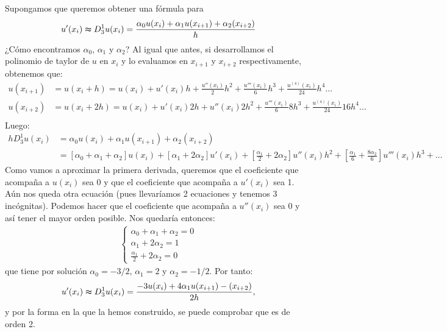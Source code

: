 \noindent Supongamos que queremos obtener una fórmula para
\begin{align*}
    u'(x_i) \thickapprox D_3^1u(x_i) = \frac{\alpha_0u(x_i) + \alpha_1u(x_{i+1}) + \alpha_2(x_{i+2})}{h}
\end{align*}
¿Cómo encontramos $\alpha_0$, $\alpha_1$ y $\alpha_2$? Al igual que antes, si desarrollamos el polinomio de taylor de $u$ en $x_i$ y lo evaluamos en $x_{i+1}$ y $x_{i+2}$ respectivamente, obtenemos que:
\begin{align*}
    u(x_{i+1}) &= u(x_i + h) =  u(x_i) + u'(x_i)h + \frac{u''(x_i)}{2}h^2 + \frac{u'''(x_i)}{6}h^3 + \frac{u^{(4)}(x_i)}{24}h^4\ldots \\
    u(x_{i+2}) &= u(x_i + 2h) =  u(x_i) + u'(x_i)2h + u''(x_i)2h^2 + \frac{u'''(x_i)}{6}8h^3 + \frac{u^{(4)}(x_i)}{24}16h^4\ldots \\
\end{align*}
Luego:
\begin{align*}
     hD_3^1u(x_i) &= \alpha_0u(x_i) + \alpha_1u(x_{i+1}) + \alpha_2(x_{i+2}) \\
    &= [\alpha_0 + \alpha_1 + \alpha_2]u(x_i) + [\alpha_1 + 2\alpha_2]u'(x_i) + \left[ \frac{\alpha_1}{2} + 2\alpha_2 \right]u''(x_i)h^2 + \left[ \frac{\alpha_1}{6} + \frac{8\alpha_2}{6} \right]u'''(x_i)h^3 + \ldots 
\end{align*}
Como vamos a aproximar la primera derivada, queremos que el coeficiente que acompaña a $u(x_i)$ sea 0 y que el coeficiente que acompaña a $u'(x_i)$ sea 1. Aún nos queda otra ecuación (pues llevaríamos 2 ecuaciones y tenemos 3 incógnitas). Podemos hacer que el coeficiente que acompaña a $u''(x_i)$ sea 0 y así tener el mayor orden posible. Nos quedaría entonces:
\begin{align*}
    \left\{ \begin{array}{lcc}
             \alpha_0 + \alpha_1 + \alpha_2 = 0\\
             \alpha_1 + 2\alpha_2 = 1 \\
             \frac{\alpha_1}{2} + 2\alpha_2 = 0
             \end{array}
   \right.
\end{align*}
que tiene por solución $\alpha_0 = -3/2$, $\alpha_1 = 2$ y $\alpha_2 = -1/2$. Por tanto:
\begin{align*}
    u'(x_i) \thickapprox D_3^1u(x_i) = \frac{-3u(x_i) + 4\alpha_1u(x_{i+1}) -(x_{i+2})}{2h},
\end{align*}
y por la forma en la que la hemos construido, se puede comprobar que es de orden 2.

